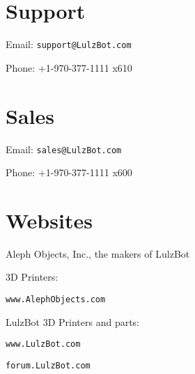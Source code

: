 %
%
%
%
%

\section{Support}
\setlength{\parindent}{0pt}
Email: \texttt{support@LulzBot.com}

Phone: +1-970-377-1111 x610

\section{Sales}

Email: \texttt{sales@LulzBot.com}

Phone: +1-970-377-1111 x600

\section{Websites}

Aleph Objects, Inc., the makers of LulzBot\textsuperscript{\miniscule{\texttrademark}}

3D Printers:

\texttt{www.AlephObjects.com}


LulzBot\textsuperscript{\miniscule{\texttrademark}} 3D Printers and parts:

\texttt{www.LulzBot.com}

\texttt{forum.LulzBot.com}
